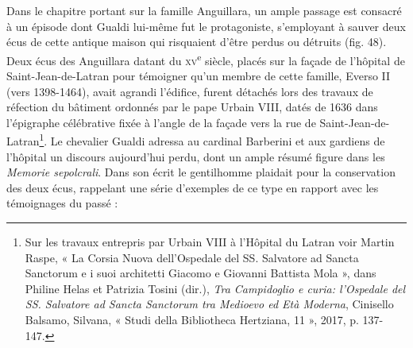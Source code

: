 \documentclass[12pt,twoside,openany]{book}
\begin{document}
Dans le chapitre portant sur la famille Anguillara, un ample passage est consacré à un épisode dont Gualdi lui-même fut le protagoniste, s’employant à sauver deux écus de cette antique maison qui risquaient d’être perdus ou détruits (fig. 48). Deux écus des Anguillara datant du \textsc{xv}\textsuperscript{e} siècle, placés sur la façade de l’hôpital de Saint-Jean-de-Latran pour témoigner qu’un membre de cette famille, Everso II (vers 1398-1464), avait agrandi l’édifice, furent détachés lors des travaux de réfection du bâtiment ordonnés par le pape Urbain VIII, datés de 1636 dans l’épigraphe célébrative fixée à l’angle de la façade vers la rue de Saint-Jean-de-Latran\footnote{Sur les travaux entrepris par Urbain VIII à l’Hôpital du Latran voir Martin Raspe, « La Corsia Nuova dell’Ospedale del SS. Salvatore ad Sancta Sanctorum e i suoi architetti Giacomo e Giovanni Battista Mola », dans Philine Helas et Patrizia Tosini (dir.), \textit{Tra Campidoglio e curia: l’Ospedale del SS. Salvatore ad Sancta Sanctorum tra Medioevo ed Età Moderna}, Cinisello Balsamo, Silvana, « Studi della Bibliotheca Hertziana, 11 », 2017, p. 137-147.}. Le chevalier Gualdi adressa au cardinal Barberini et aux gardiens de l’hôpital un discours aujourd’hui perdu, dont un ample résumé figure dans les \textit{Memorie sepolcrali}. Dans son écrit le gentilhomme plaidait pour la conservation des deux écus, rappelant une série d’exemples de ce type en rapport avec les témoignages du passé :
\end{document}

